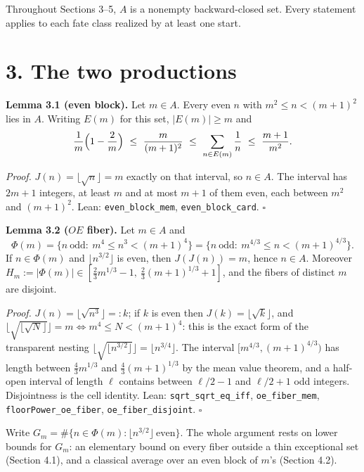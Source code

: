 \documentclass[11pt,a4paper]{article}
\begin{document}
Throughout Sections 3--5, \(A\) is a nonempty backward-closed set. Every
statement applies to each fate class realized by at least one start.

\section{3. The two productions}\label{the-two-productions}

\textbf{Lemma 3.1 (even block).} Let \(m\in A\). Every even \(n\) with
\(m^2\le n<(m+1)^2\) lies in \(A\). Writing \(E(m)\) for this set,
\(|E(m)|\ge m\) and \[
\frac1m\Bigl(1-\frac2m\Bigr)\ \le\ \frac{m}{(m+1)^2}\ \le\ \sum_{n\in E(m)}\frac1n\ \le\ \frac{m+1}{m^2}.
\]

\emph{Proof.} \(J(n)=\lfloor\sqrt n\rfloor=m\) exactly on that interval,
so \(n\in A\). The interval has \(2m+1\) integers, at least \(m\) and at
most \(m+1\) of them even, each between \(m^2\) and \((m+1)^2\). Lean:
\texttt{\nolinkurl{even_block_mem}},
\texttt{\nolinkurl{even_block_card}}. \(\square\)

\textbf{Lemma 3.2 (\(OE\) fiber).} Let \(m\in A\) and \[
\Phi(m)=\{n\ \text{odd}:\ m^4\le n^3<(m+1)^4\}
=\{n\ \text{odd}:\ m^{4/3}\le n<(m+1)^{4/3}\}.
\] If \(n\in\Phi(m)\) and \(\lfloor n^{3/2}\rfloor\) is even, then
\(J(J(n))=m\), hence \(n\in A\). Moreover
\(H_m:=|\Phi(m)|\in[\tfrac23m^{1/3}-1,\ \tfrac23(m+1)^{1/3}+1]\), and
the fibers of distinct \(m\) are disjoint.

\emph{Proof.} \(J(n)=\lfloor\sqrt{n^3}\rfloor=:k\); if \(k\) is even
then \(J(k)=\lfloor\sqrt k\rfloor\), and
\(\lfloor\sqrt{\lfloor\sqrt N\rfloor}\rfloor=m\iff m^4\le N<(m+1)^4\):
this is the exact form of the transparent nesting
\(\lfloor\sqrt{\lfloor n^{3/2}\rfloor}\rfloor=\lfloor n^{3/4}\rfloor\).
The interval \([m^{4/3},(m+1)^{4/3})\) has length between
\(\tfrac43m^{1/3}\) and \(\tfrac43(m+1)^{1/3}\) by the mean value
theorem, and a half-open interval of length \(\ell\) contains between
\(\ell/2-1\) and \(\ell/2+1\) odd integers. Disjointness is the cell
identity. Lean: \texttt{\nolinkurl{sqrt_sqrt_eq_iff}},
\texttt{\nolinkurl{oe_fiber_mem}},
\texttt{\nolinkurl{floorPower_oe_fiber}},
\texttt{\nolinkurl{oe_fiber_disjoint}}. \(\square\)

Write \(G_m=\#\{n\in\Phi(m):\lfloor n^{3/2}\rfloor\ \text{even}\}\). The
whole argument rests on lower bounds for \(G_m\): an elementary bound on
every fiber outside a thin exceptional set (Section 4.1), and a
classical average over an even block of \(m\)'s (Section 4.2).
\end{document}
